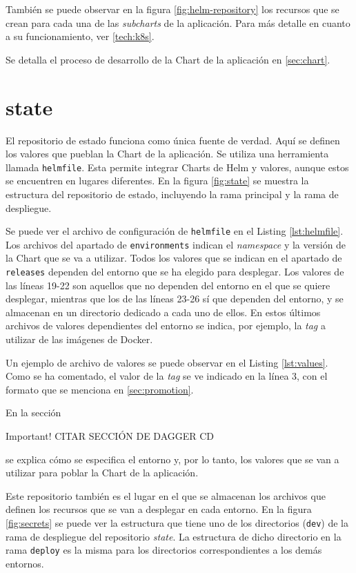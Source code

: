 También se puede observar en la figura \ref{fig:helm-repository} los recursos que se crean para cada una de las \textit{subcharts} de la aplicación. Para más detalle en cuanto a su funcionamiento, ver \ref{tech:k8s}.

Se detalla el proceso de desarrollo de la Chart de la aplicación en \ref{sec:chart}.

\section{state}
\label{subsec:state}

El repositorio de estado funciona como única fuente de verdad. Aquí se definen  los valores que pueblan la Chart de la aplicación. Se utiliza una herramienta llamada \texttt{helmfile}\cite{helmfile}. Esta permite integrar Charts de Helm y valores, aunque estos se encuentren en lugares diferentes. En la figura \ref{fig:state} se muestra la estructura del repositorio de estado, incluyendo la rama principal y la rama de despliegue.

Se puede ver el archivo de configuración de \texttt{helmfile} en el Listing \ref{lst:helmfile}. Los archivos del apartado de \texttt{environments} indican el \textit{namespace} y la versión de la Chart que se va a utilizar. Todos los valores que se indican en el apartado de \texttt{releases} dependen del entorno que se ha elegido para desplegar. Los valores de las líneas 19-22 son aquellos que no dependen del entorno en el que se quiere desplegar, mientras que los de las líneas 23-26 sí que dependen del entorno, y se almacenan en un directorio dedicado a cada uno de ellos. En estos últimos archivos de valores dependientes del entorno se indica, por ejemplo, la \textit{tag} a utilizar de las imágenes de Docker.

Un ejemplo de archivo de valores se puede observar en el Listing \ref{lst:values}. Como se ha comentado, el valor de la \textit{tag} se ve indicado en la línea 3, con el formato que se menciona en \ref{sec:promotion}.

En la sección
\begin{bclogo}[logo=\bcattention]{Important!}
  CITAR SECCIÓN DE DAGGER CD
\end{bclogo}
se explica cómo se especifica el entorno y, por lo tanto, los valores que se van a utilizar para poblar la Chart de la aplicación.

Este repositorio también es el lugar en el que se almacenan los archivos que definen los recursos que se van a desplegar en cada entorno. En la figura \ref{fig:secrets} se puede ver la estructura que tiene uno de los directorios (\texttt{dev}) de la rama de despliegue del repositorio \textit{state}. La estructura de dicho directorio en la rama \texttt{deploy} es la misma para los directorios correspondientes a los demás entornos.
